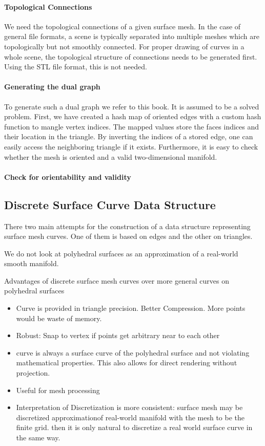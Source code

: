\documentclass{stdlocal}
\begin{document}
  \paragraph{Topological Connections}
  We need the topological connections of a given surface mesh.
  In the case of general file formats, a scene is typically separated into multiple meshes which are topologically but not smoothly connected.
  For proper drawing of curves in a whole scene, the topological structure of connections needs to be generated first.
  Using the STL file format, this is not needed.

  \paragraph{Generating the dual graph}
   To generate such a dual graph we refer to this book.
  It is assumed to be a solved problem.
  First, we have created a hash map of oriented edges with a custom hash function to mangle vertex indices.
  The mapped values store the faces indices and their location in the triangle.
  By inverting the indices of a stored edge, one can easily access the neighboring triangle if it exists.
  Furthermore, it is easy to check whether the mesh is oriented and a valid two-dimensional manifold.

  \paragraph{Check for orientability and validity}


\subsection{Discrete Surface Curve Data Structure} %
\label{sub:discrete_surface_curve_data_structure}
  There two main attempts for the construction of a data structure representing surface mesh curves.
  One of them is based on edges and the other on triangles.

  We do not look at polyhedral surfaces as an approximation of a real-world smooth manifold.

  Advantages of discrete surface mesh curves over more general curves on polyhedral surfaces
  \begin{itemize}
    \item Curve is provided in triangle precision. Better Compression. More points would be waste of memory.
    \item Robust: Snap to vertex if points get arbitrary near to each other
    \item curve is always a surface curve of the polyhedral surface and not violating mathematical properties. This also allows for direct rendering without projection.
    \item Useful for mesh processing
    \item Interpretation of Discretization is more consistent: surface mesh may be discretized approximationof real-world manifold with the mesh to be the finite grid. then it is only natural to discretize a real world surface curve in the same way.
  \end{itemize}
\end{document}
